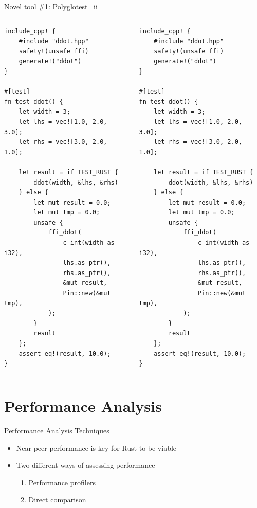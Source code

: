 \documentclass[10pt,aspectratio=169]{beamer}
\begin{document}
\begin{frame}[fragile]{Novel tool \#1: Polyglotest \ ii}
        \begin{columns}[T,onlytextwidth]
            \centering
            \begin{verbatim}
include_cpp! {
    #include "ddot.hpp"
    safety!(unsafe_ffi)
    generate!("ddot")
}

#[test]
fn test_ddot() {
    let width = 3;
    let lhs = vec![1.0, 2.0, 3.0];
    let rhs = vec![3.0, 2.0, 1.0];

    let result = if TEST_RUST {
        ddot(width, &lhs, &rhs)
    } else {
        let mut result = 0.0;
        let mut tmp = 0.0;
        unsafe {
            ffi_ddot(
                c_int(width as i32),
                lhs.as_ptr(),
                rhs.as_ptr(),
                &mut result,
                Pin::new(&mut tmp),
            );
        }
        result
    };
    assert_eq!(result, 10.0);
}
            \end{verbatim}
            \begin{verbatim}
include_cpp! {
    #include "ddot.hpp"
    safety!(unsafe_ffi)
    generate!("ddot")
}

#[test]
fn test_ddot() {
    let width = 3;
    let lhs = vec![1.0, 2.0, 3.0];
    let rhs = vec![3.0, 2.0, 1.0];

    let result = if TEST_RUST {
        ddot(width, &lhs, &rhs)
    } else {
        let mut result = 0.0;
        let mut tmp = 0.0;
        unsafe {
            ffi_ddot(
                c_int(width as i32),
                lhs.as_ptr(),
                rhs.as_ptr(),
                &mut result,
                Pin::new(&mut tmp),
            );
        }
        result
    };
    assert_eq!(result, 10.0);
}
            \end{verbatim}
        \end{columns}
\end{frame}




\section{Performance Analysis}
\begin{frame}{Performance Analysis Techniques}
    \begin{itemize}
        \item Near-peer performance is key for Rust to be viable
        \item Two different ways of assessing performance
        \begin{enumerate}
            \item Performance profilers
            \item Direct comparison
        \end{enumerate}
    \end{itemize}
\end{frame}
\end{document}
